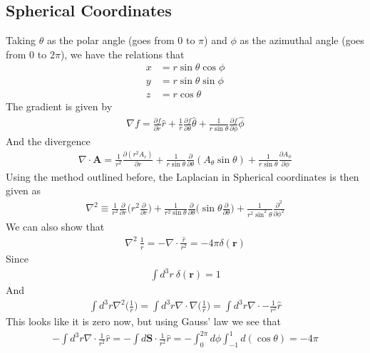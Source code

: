 \subsection{Spherical Coordinates}\label{sphere}
Taking $\theta$ as the polar angle (goes from 0 to $\pi$) and $\phi$ as the azimuthal angle (goes from $0$ to $2\pi$), we have the relations that
\begin{align}\label{sphere}
x &= r\sin\theta\cos\phi\\
y &= r\sin\theta\sin\phi\\
z &= r\cos\theta
\end{align}
The gradient is given by
\begin{align}
\nabla f = \frac{\partial f}{\partial r}\hat{r} +\frac{1}{r}\frac{\partial f}{\partial \theta}\hat{\theta} + \frac{1}{r\sin\theta}\frac{\partial f}{\partial\phi}\hat{\phi}
\end{align}
And the divergence
\begin{align}
\nabla\cdot\textbf{A} = \frac{1}{r^2}\frac{\partial(r^2A_r)}{\partial r} + \frac{1}{r\sin\theta}\frac{\partial}{\partial\theta}(A_\theta\sin\theta) + \frac{1}{r\sin\theta}\frac{\partial A_\phi}{\partial\phi}
\end{align}
Using the method outlined before, the Laplacian in Spherical coordinates is then given as
\begin{align}
\nabla^2\equiv \frac{1}{r^2} \frac{\partial}{\partial r}\Big(r^2\frac{\partial}{\partial r}\Big) + \frac{1}{r^2\sin\theta}\frac{\partial}{\partial\theta}\Big(\sin\theta\frac{\partial}{\partial\theta}\Big) +\frac{1}{r^2\sin^2\theta}\frac{\partial^2}{\partial\phi^2} 
\end{align}
We can also show that 
\begin{align}\label{dirac}
\boxed{\nabla^2 ~\frac{1}{r}= -\nabla\cdot\frac{\hat{r}}{r^2} = -4\pi\delta(\textbf{r})}
\end{align}
Since
\begin{align}
\int d^3r ~\delta(\textbf{r}) = 1
\end{align}
And
\begin{align}
\int d^3r \nabla^2\Big(\frac{1}{r}\Big) = \int d^3r \nabla\cdot\nabla\Big(\frac{1}{r}\Big) = \int d^3 r \nabla\cdot -\frac{1}{r^2}\hat{r}
\end{align}
This looks like it is zero now, but using Gauss' law we see that
\begin{align}
- \int d^3 r \nabla\cdot \frac{1}{r^2}\hat{r} = -\int d\textbf{S}\cdot \frac{1}{r^2}\hat{r} = -\int_0^{2\pi}d\phi\int_{-1}^1 d(\cos\theta) = -4\pi
\end{align}
